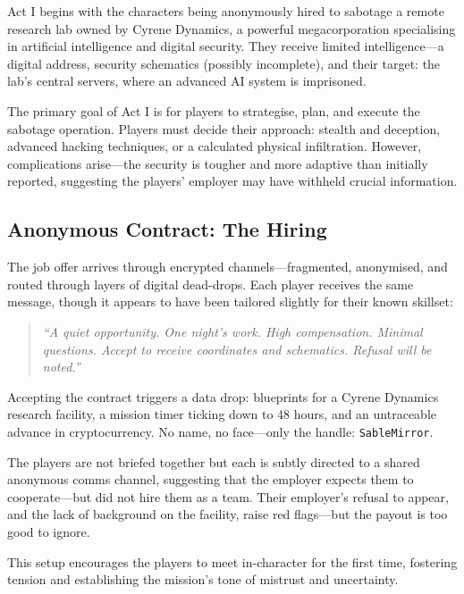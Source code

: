 \documentclass[nodeprecatedcode,bg=print]{dndbook}
\begin{document}
\begin{multicols}{2}
Act I begins with the characters being anonymously hired to sabotage a remote research lab owned by Cyrene Dynamics, a powerful megacorporation specialising in artificial intelligence and digital security. They receive limited intelligence—a digital address, security schematics (possibly incomplete), and their target: the lab's central servers, where an advanced AI system is imprisoned.

The primary goal of Act I is for players to strategise, plan, and execute the sabotage operation. Players must decide their approach: stealth and deception, advanced hacking techniques, or a calculated physical infiltration. However, complications arise—the security is tougher and more adaptive than initially reported, suggesting the players' employer may have withheld crucial information.


\subsection*{Anonymous Contract: The Hiring}

The job offer arrives through encrypted channels—fragmented, anonymised, and routed through layers of digital dead-drops. Each player receives the same message, though it appears to have been tailored slightly for their known skillset:

\vspace{0.5\baselineskip} \begin{quote} \textit{“A quiet opportunity. One night’s work. High compensation. Minimal questions. Accept to receive coordinates and schematics. Refusal will be noted.”} \end{quote} \vspace{0.5\baselineskip}

Accepting the contract triggers a data drop: blueprints for a Cyrene Dynamics research facility, a mission timer ticking down to 48 hours, and an untraceable advance in cryptocurrency. No name, no face—only the handle: \texttt{SableMirror}.

The players are not briefed together but each is subtly directed to a shared anonymous comms channel, suggesting that the employer expects them to cooperate—but did not hire them as a team. Their employer's refusal to appear, and the lack of background on the facility, raise red flags—but the payout is too good to ignore.

This setup encourages the players to meet in-character for the first time, fostering tension and establishing the mission’s tone of mistrust and uncertainty.



\end{multicols}
\end{document}
